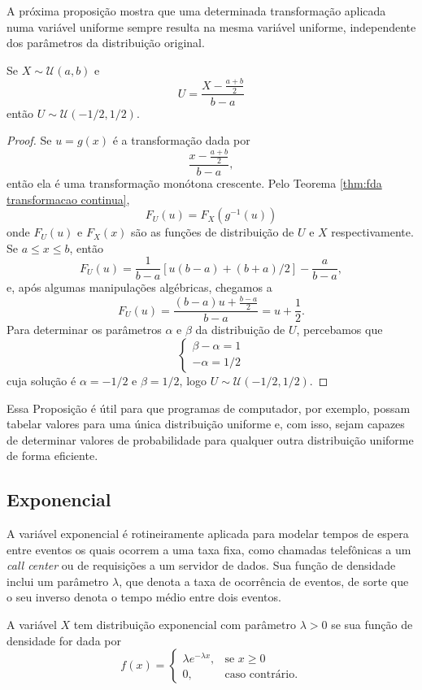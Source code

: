 A próxima proposição mostra que uma determinada transformação aplicada numa variável
uniforme sempre resulta na mesma variável uniforme, independente dos parâmetros da
distribuição original.

\begin{prop:transformacao uniforme continua}
\label{prop:transformacao uniforme continua}
Se $X \sim \mathcal{U}(a, b)$ e
\[
    U = \frac{X - \frac{a+b}{2}}{b-a}
\]
então $U \sim \mathcal{U}(-1/2, 1/2)$.
\end{prop:transformacao uniforme continua}
\begin{proof}
Se $u = g(x)$ é a transformação dada por
\[
    \frac{x - \frac{a+b}{2}}{b-a},
\]
então ela é uma transformação monótona crescente.
Pelo Teorema \ref{thm:fda transformacao continua},
\[
   F_U(u) = F_X(g^{-1}(u))
\]
onde $F_U(u)$ e $F_X(x)$ são as funções de distribuição de $U$ e $X$ respectivamente.
Se $a \le x \le b$, então
\[
   F_U(u) = \frac{1}{b-a} [u(b-a) + (b+a)/2] - \frac{a}{b-a},
\]
e, após algumas manipulações algébricas, chegamos a
\[
    F_U(u) = \frac{(b-a)u + \frac{b-a}{2}}{b-a} = u + \frac{1}{2}.
\]
Para determinar os parâmetros $\alpha$ e $\beta$ da distribuição de $U$, percebamos que
\[
    \begin{cases}
        \beta-\alpha = 1 \\
        -\alpha = 1/2
    \end{cases}
\]
cuja solução é $\alpha = -1/2$ e $\beta = 1/2$, logo $U \sim \mathcal{U}(-1/2, 1/2)$.
\end{proof}

Essa Proposição é útil para que programas de computador, por exemplo, possam tabelar
valores para uma única distribuição uniforme e, com isso, sejam capazes de determinar
valores de probabilidade para qualquer outra distribuição uniforme de forma eficiente.

\subsection{Exponencial}

A variável exponencial é rotineiramente aplicada para modelar tempos de espera entre
eventos os quais ocorrem a uma taxa fixa, como chamadas telefônicas a um
\textit{call center} ou de requisições a um servidor de dados.
Sua função de densidade inclui um parâmetro $\lambda$, que denota a taxa de ocorrência
de eventos, de sorte que o seu inverso denota o tempo médio entre dois eventos.

\begin{def:exponencial}
A variável $X$ tem distribuição exponencial com parâmetro $\lambda > 0$ se sua função de
densidade for dada por
\[
    f(x) = \begin{cases}
        \lambda e^{-\lambda x},&\text{se } x \ge 0 \\
        0,&\text{caso contrário.}
    \end{cases}
\]
\end{def:exponencial}

